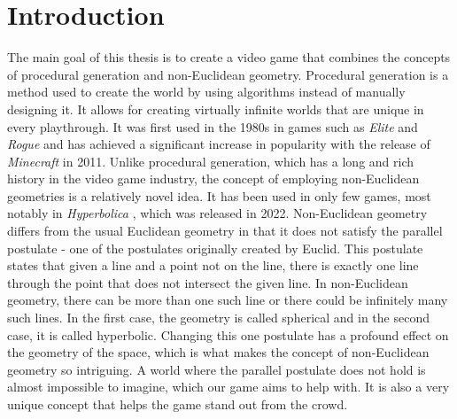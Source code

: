 \chapter{Introduction}\label{ch:introduction}


The main goal of this thesis is to create a video game that combines the concepts of procedural generation and non-Euclidean geometry.
Procedural generation is a method used to create the world by using algorithms instead of manually designing it.
It allows for creating virtually infinite worlds that are unique in every playthrough.
It was first used in the 1980s in games such as \textit{Elite} \cite{Elite1984} and \textit{Rogue} \cite{Rogue1980} and has achieved a significant increase in popularity with the release of \textit{Minecraft} \cite{Minecraft} in 2011.
Unlike procedural generation, which has a long and rich history in the video game industry, the concept of employing non-Euclidean geometries is a relatively novel idea.
It has been used in only few games, most notably in \textit{Hyperbolica} \cite{Hyperbolica}, which was released in 2022.
Non-Euclidean geometry differs from the usual Euclidean geometry in that it does not satisfy the parallel postulate - one of the postulates originally created by Euclid.
This postulate states that given a line and a point not on the line, there is exactly one line through the point that does not intersect the given line.
In non-Euclidean geometry, there can be more than one such line or there could be infinitely many such lines.
In the first case, the geometry is called spherical and in the second case, it is called hyperbolic.
Changing this one postulate has a profound effect on the geometry of the space, which is what makes the concept of non-Euclidean geometry so intriguing.
A world where the parallel postulate does not hold is almost impossible to imagine, which our game aims to help with.
It is also a very unique concept that helps the game stand out from the crowd.

